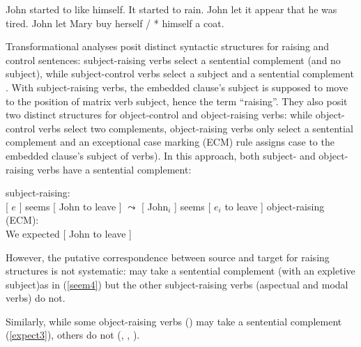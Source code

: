 \documentclass[output=paper
	        ,collection
	        ,collectionchapter
 	        ,biblatex
                ,babelshorthands
                ,newtxmath
                ,draftmode
                ,colorlinks, citecolor=brown
]{langscibook}
\begin{document}
\eal
\ex John started to like himself.
\ex It started to rain.
\ex John let it appear that he was tired.
\ex John let Mary buy herself / * himself a coat.
\zl
	

Transformational analyses posit distinct syntactic structures for raising and control sentences:
subject-raising verbs select a sentential complement (and no subject), while subject-control verbs
select a subject and a sentential complement \citep{Postal1974, Chomsky81a}. With subject-raising
verbs, the embedded clause's subject is supposed to move to the position of matrix verb subject,
hence the  term ``raising''. They also posit two distinct structures for object-control and
object-raising verbs: while object-control verbs select two complements, object-raising verbs only
select a sentential complement and an exceptional case marking (ECM) rule assigns case to the
embedded clause's subject of  verbs).
In this approach, both subject- and object-raising verbs have a sentential complement:
	
\eal
\ex subject-raising:\\
{}[ $e$ ] seems [ John to leave ] 
$\leadsto$  
{}[ John$_{i}$ ] seems [ $e_{i}$ to leave ]	
\ex object-raising (ECM):\\
We expected [ John to leave ] 	
\zl

However, the putative correspondence between source and target for raising structures is not
systematic:  may take a sentential complement (with an expletive subject)as in
(\ref{seem4}) but the other subject-raising verbs (aspectual and modal verbs) do not.

\eal
{}
\zl
 
Similarly, while some object-raising verbs () may take a sentential complement (\ref{expect3}), others do not (, , ).
 
\eal
{}
\zl
\eal
{}
\zl
\end{document}
